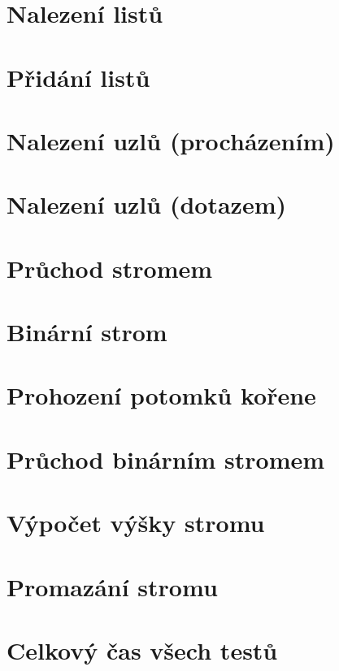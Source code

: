 \section{Nalezení listů}
\section{Přidání listů}
\section{Nalezení uzlů (procházením)}
\section{Nalezení uzlů (dotazem)}
\section{Průchod stromem}
\section{Binární strom}
\section{Prohození potomků kořene}
\section{Průchod binárním stromem}
\section{Výpočet výšky stromu}
\section{Promazání stromu}
\section{Celkový čas všech testů}
